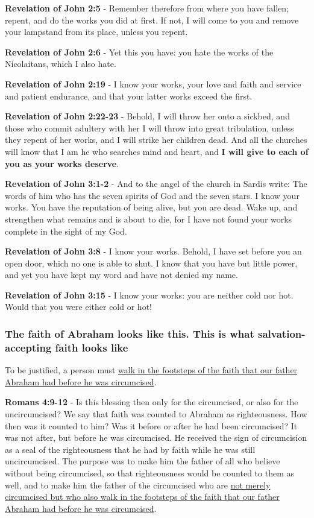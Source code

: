 \documentclass[11pt]{article}
\begin{document}
\textbf{Revelation of John 2:5} - Remember therefore from where you have fallen; repent, and do the works you did at first. If not, I will come to you and remove your lampstand from its place, unless you repent.

\textbf{Revelation of John 2:6} - Yet this you have: you hate the works of the Nicolaitans, which I also hate.

\textbf{Revelation of John 2:19} - I know your works, your love and faith and service and patient endurance, and that your latter works exceed the first.

\textbf{Revelation of John 2:22-23} - Behold, I will throw her onto a sickbed, and those who commit adultery with her I will throw into great tribulation, unless they repent of her works, and I will strike her children dead. And all the churches will know that I am he who searches mind and heart, and \textbf{I will give to each of you as your works deserve}.

\textbf{Revelation of John 3:1-2} - And to the angel of the church in Sardis write: The words of him who has the seven spirits of God and the seven stars. I know your works. You have the reputation of being alive, but you are dead. Wake up, and strengthen what remains and is about to die, for I have not found your works complete in the sight of my God.

\textbf{Revelation of John 3:8} - I know your works. Behold, I have set before you an open door, which no one is able to shut. I know that you have but little power, and yet you have kept my word and have not denied my name.

\textbf{Revelation of John 3:15} - I know your works: you are neither cold nor hot. Would that you were either cold or hot!

\subsubsection{The faith of Abraham looks like this. This is what salvation-accepting faith looks like}
\label{sec:org67f6fba}
To be justified, a person must \uline{walk in the footsteps of the faith that our father Abraham had before he was circumcised}.

\textbf{Romans 4:9-12} - Is this blessing then only for the circumcised, or also for the uncircumcised? We say that faith was counted to Abraham as righteousness. How then was it counted to him? Was it before or after he had been circumcised? It was not after, but before he was circumcised. He received the sign of circumcision as a seal of the righteousness that he had by faith while he was still uncircumcised. The purpose was to make him the father of all who believe without being circumcised, so that righteousness would be counted to them as well, and to make him the father of the circumcised who are \uline{not merely circumcised but who also walk in the footsteps of the faith that our father Abraham had before he was circumcised}.
\end{document}
